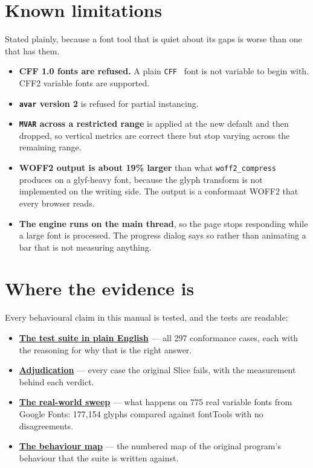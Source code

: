 \documentclass[11pt,a4paper]{article}
\begin{document}
\section{Known limitations}

Stated plainly, because a font tool that is quiet about its gaps is worse than one that has them.

\begin{itemize}
  \item \textbf{CFF 1.0 fonts are refused.} A plain \texttt{CFF } font is not variable to begin with. CFF2 variable fonts are supported.
  \item \textbf{\texttt{avar} version 2} is refused for partial instancing.
  \item \textbf{\texttt{MVAR} across a restricted range} is applied at the new default and then dropped, so vertical metrics are correct there but stop varying across the remaining range.
  \item \textbf{WOFF2 output is about 19\% larger} than what \texttt{woff2\_compress} produces on a glyf-heavy font, because the glyph transform is not implemented on the writing side. The output is a conformant WOFF2 that every browser reads.
  \item \textbf{The engine runs on the main thread}, so the page stops responding while a large font is processed. The progress dialog says so rather than animating a bar that is not measuring anything.
\end{itemize}

\section{Where the evidence is}

Every behavioural claim in this manual is tested, and the tests are readable:

\begin{itemize}
  \item \textbf{\href{https://felipesanches.github.io/slice-web/test-suite.html}{The test suite in plain English}} --- all 297 conformance cases, each with the reasoning for why that is the right answer.
  \item \textbf{\href{https://felipesanches.github.io/slice-web/adjudication.html}{Adjudication}} --- every case the original Slice fails, with the measurement behind each verdict.
  \item \textbf{\href{https://felipesanches.github.io/slice-web/real-world-sweep.html}{The real-world sweep}} --- what happens on 775 real variable fonts from Google Fonts: 177,154 glyphs compared against fontTools with no disagreements.
  \item \textbf{\href{https://felipesanches.github.io/slice-web/original-behaviour.html}{The behaviour map}} --- the numbered map of the original program's behaviour that the suite is written against.
\end{itemize}
\end{document}
